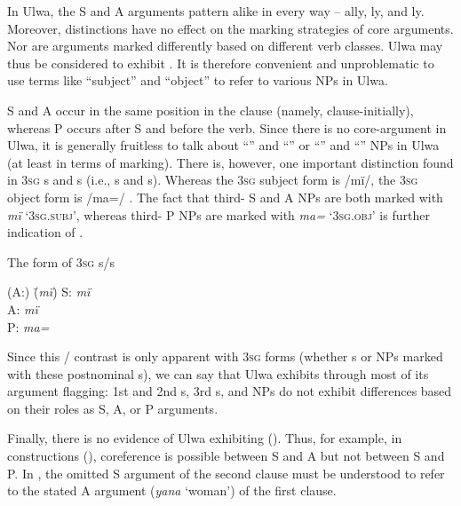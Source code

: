 
In Ulwa, the S and A arguments pattern alike in every way -- ally, ly, and ly. Moreover,  distinctions have no effect on the marking strategies of core arguments. Nor are arguments marked differently based on different verb classes. Ulwa may thus be considered to exhibit . It is therefore convenient and unproblematic to use terms like “subject” and “object” to refer to various NPs in Ulwa.

  S and A occur in the same position in the clause (namely, clause-initially), whereas P occurs after S and before the verb. Since there is no  core-argument  in Ulwa, it is generally fruitless to talk about “” and “” or “” and “” NPs in Ulwa (at least in terms of  marking). There is, however, one important distinction found in 3\textsc{sg} s and s (i.e., s and s). Whereas the 3\textsc{sg} subject form is /mï/, the 3\textsc{sg} object form is /ma=/ . The fact that third- S and A NPs are both marked with \textit{mï} ‘3\textsc{sg.subj}’, whereas third- P NPs are marked with \textit{ma=} ‘3\textsc{sg.obj}’ is further indication of .

  \ea%
    \label{ex:clause:24b}
The form of 3\textsc{sg} s/s
 \begin{tabbing}
{(A:)} \= {(\textit{mï})}\kill
{S:} \> {\textit{mï}}\\
{A:} \> {\textit{mï}}\\
{P:} \> {\textit{ma=}}
\end{tabbing}
\z

  Since this /  contrast is only apparent with 3\textsc{sg} forms (whether s or NPs marked with these postnominal s), we can say that Ulwa exhibits  through most of its argument flagging: 1st and 2nd  s,  3rd  s, and  NPs do not exhibit  differences based on their roles as S, A, or P arguments.

  Finally, there is no evidence of Ulwa exhibiting  (\citealt[62--63]{Dixon1979}). Thus, for example, in  constructions (), coreference is possible between S and A but not between S and P. In , the omitted S argument of the second clause must be understood to refer to the stated A argument (\textit{yana} ‘woman’) of the first clause.

